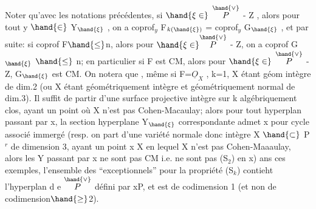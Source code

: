 
Noter qu'avec les notations précédentes, si $\hand{\xi\in}$ $\overset{\hand{\vee}}{P}$ - Z , alors pour tout
y $\hand{\in}$ Y$_{\hand{\xi}}$ , on a coprof$_y$ F$_{k(\hand{\xi})}$ = coprof$_y$ G$_{\hand{\xi}}$ , et par suite: si coprof F$\hand{\leq}$n,
alors pour $\hand{\xi\in}\overset{\hand{\vee}}{P}$ - Z, on a coprof G$_{\hand{\xi}}$ $\hand{\leq}$ n; en particulier si F est CM, alors
pour $\hand{\xi\in}$ $\overset{\hand{\vee}}{P}$ - Z, G$_{\hand{\xi}}$ est CM. 
 On notera que  
, même si F=$\underline{O}_X$ , k=1, X étant géom intègre de dim.2 (ou  X étant
géométriquement intègre et géométriquement normal de dim.3). Il suffit
de partir d'une surface projective  intègre  sur k algébriquement
clos, ayant un point  où X n'est pas Cohen-Macaulay; alors pour tout
hyperplan passant par x, la section hyperplane Y$_{\hand{\xi}}$ correspondante admet
x pour cycle associé immergé (resp. on part d'une variété normale\hand{,} \hand{(}donc
 intègre X $\hand{\subset}$ P$^r$ de dimension 3, ayant un point x \hand{$\in$} X en lequel X n'est pas
Cohen-Maaaulay, alors les Y passant par x ne sont pas  CM i.e. ne sont
pas (S$_2$) en x) ans ces exemples, l'ensemble des \hand{$\xi$} ``exceptionnels''
pour la propriété (S$_k$) contieht l'hyperplan d e $\overset{\hand{\vee}}{P}$ défini par x\hand{$\in$}P, et est
de codimension 1 (et non de codimension$\hand{\geq}$2). 



